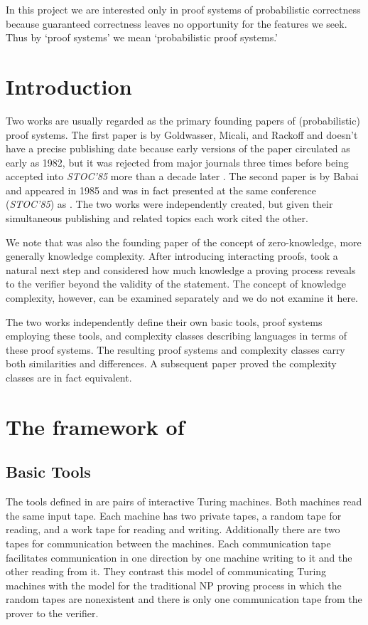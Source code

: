 
In this project we are interested only in proof systems of probabilistic correctness because guaranteed correctness leaves no opportunity for the features we seek.
Thus by `proof systems' we mean `probabilistic proof systems.'


\section{Introduction}

Two works are usually regarded as the primary founding papers of (probabilistic) proof systems.
The first paper is by Goldwasser, Micali, and Rackoff \cite{GMR85} and doesn't have a precise publishing date because early versions of the paper circulated as early as 1982, but it was rejected from major journals three times before being accepted into \emph{STOC'85} more than a decade later \cite{Gol02}.
The second paper is by Babai \cite{Bab85} and appeared in 1985 and was in fact presented at the same conference (\emph{STOC'85}) as \cite{GMR85}. The two works were independently created, but given their simultaneous publishing and related topics each work cited the other.

We note that \cite{GMR85} was also the founding paper of the concept of zero-knowledge, more generally knowledge complexity.
After introducing interacting proofs, \cite{GMR85} took a natural next step and considered how much knowledge a proving process reveals to the verifier beyond the validity of the statement.
The concept of knowledge complexity, however, can be examined separately and we do not examine it here.

The two works independently define their own basic tools, proof systems employing these tools, and complexity classes describing languages in terms of these proof systems.
The resulting proof systems and complexity classes carry both similarities and differences.
A subsequent paper \cite{GS86} proved the complexity classes are in fact equivalent.


\section{The framework of \cite{GMR85}}

\subsection{Basic Tools}

The tools defined in \cite{GMR85} are pairs of interactive Turing machines.
Both machines read the same input tape.
Each machine has two private tapes, a random tape for reading, and a work tape for reading and writing.
Additionally there are two tapes for communication between the machines.
Each communication tape facilitates communication in one direction by one machine writing to it and the other reading from it.
They contrast this model of communicating Turing machines with the model for the traditional NP proving process in which the random tapes are nonexistent and there is only one communication tape from the prover to the verifier.

